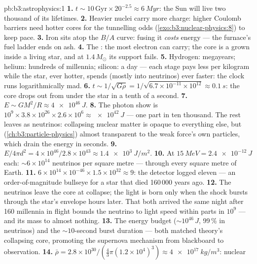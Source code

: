 \begin{solution}{pb:b3:astrophysics:1}
\textbf{1.} $t \sim 10\,\text{Gyr}\times20^{-2.5} \approx
\qty{6}{Myr}$: the Sun will live two thousand of its lifetimes.
\textbf{2.} Heavier nuclei carry more charge: higher Coulomb
barriers need hotter cores for the tunnelling odds
(\cref{exo:b3:nuclear-physics:8}) to keep pace.
\textbf{3.} Iron sits atop the $B/A$ curve: fusing it
\emph{costs} energy --- the furnace's fuel ladder ends on ash.
\textbf{4.} The : the most electron
 can carry; the core is a  grown
inside a living star, and at $1.4\,M_\odot$ its support fails.
\textbf{5.} Hydrogen: megayears; helium: hundreds of millennia;
silicon: a day --- each stage pays less per kilogram while the
star, ever hotter, spends (mostly into neutrinos) ever faster:
the clock runs logarithmically mad.
\textbf{6.} $t \sim 1/\sqrt{G\rho} =
1/\sqrt{6.7\times10^{-11}\times10^{12}} \approx \qty{0.1}{s}$:
the core drops out from under the star in a tenth of a second.
\textbf{7.} $E \sim GM^2/R \approx \qty{4e46}{J}$.
\textbf{8.} The photon show is $10^9\times3.8\times10^{26}
\times2.6\times10^{6} \approx \qty{e42}{J}$ --- one part in ten
thousand. The rest leaves as neutrinos: collapsing nuclear
matter is opaque to everything else, but
(\cref{ch:b3:particle-physics}) almost transparent to the weak
force's own particles, which drain the energy in seconds.
\textbf{9.} $E/4\pi d^2 = 4\times10^{46}/2.8\times10^{43}
\approx \qty{1.4e3}{J/m^2}$.
\textbf{10.} At $\qty{15}{MeV} = \qty{2.4e-12}{J}$ each:
${\sim}6\times10^{14}$ neutrinos per square metre --- through
every square metre of Earth.
\textbf{11.} $6\times10^{14}\times10^{-46}\times1.5\times
10^{32} \approx 9$: the detector logged eleven --- an
order-of-magnitude bullseye for a star that died 160\,000 years
ago.
\textbf{12.} The neutrinos leave the core at collapse; the
light is born only when the shock bursts through the star's
envelope hours later. That both arrived the same night after
160 millennia in flight bounds the neutrino to light speed
within parts in $10^{9}$ --- and its mass to almost nothing.
\textbf{13.} The energy budget ($\sim10^{46}\,\unit{J}$, 99\,\%
in neutrinos) and the ${\sim}10$-second burst duration ---
both matched theory's collapsing core, promoting the
supernova mechanism from blackboard to observation.
\textbf{14.} $\bar\rho = 2.8\times10^{30}/(\tfrac43\pi
(1.2\times10^4)^3) \approx \qty{4e17}{kg/m^3}$: nuclear

\end{solution}
